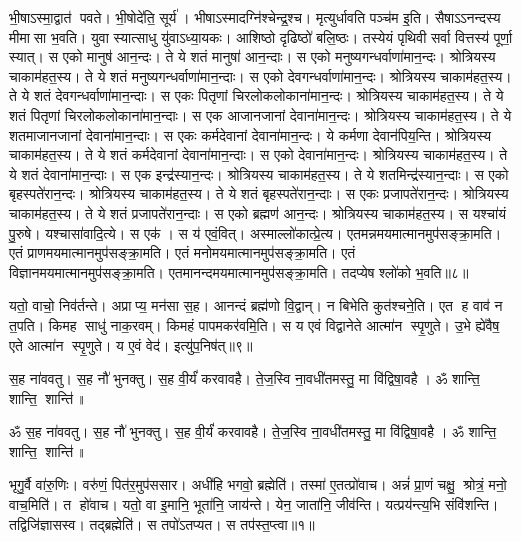 भी॒षाऽस्मा॒द्वात॑ पवते। भी॒षोदे॑ति॒ सूर्य॑। भीषाऽस्मादग्नि॑श्चेन्द्र॒श्च। मृत्युर्धावति पञ्च॑म इ॒ति। सैषाऽऽनन्दस्य मीमासा भ॒वति। युवा स्यात्साधु यु॑वाऽध्या॒यकः। आशिष्ठो दृढिष्ठो॑ बलि॒ष्ठः। तस्येयं पृथिवी सर्वा वित्तस्य॑ पूर्णा॒ स्यात्। स एको मानुष॑ आन॒न्दः। ते ये शतं मानुषा॑ आन॒न्दाः। स एको मनुष्यगन्धर्वाणा॑मान॒न्दः। श्रोत्रियस्य चाकाम॑हत॒स्य। ते ये शतं मनुष्यगन्धर्वाणा॑मान॒न्दाः। स एको देवगन्धर्वाणा॑मान॒न्दः। श्रोत्रियस्य चाकाम॑हत॒स्य। ते ये शतं देवगन्धर्वाणा॑मान॒न्दाः। स एकः पितृणां चिरलोकलोकाना॑मान॒न्दः। श्रोत्रियस्य चाकाम॑हत॒स्य। ते ये शतं पितृणां चिरलोकलोकाना॑\-मान॒न्दाः। स एक आजानजानां देवाना॑मान॒न्दः। श्रोत्रियस्य चाकाम॑हत॒स्य। ते ये शतमाजानजानां देवाना॑मान॒न्दाः। स एकः कर्मदेवानां देवाना॑मान॒न्दः। ये कर्मणा देवान॑पिय॒न्ति। श्रोत्रियस्य चाकाम॑हत॒स्य। ते ये शतं कर्मदेवानां देवाना॑मान॒न्दाः। स एको देवाना॑मान॒न्दः। श्रोत्रियस्य चाकाम॑हत॒स्य। ते ये शतं देवाना॑मान॒न्दाः। स एक इन्द्र॑स्यान॒न्दः। श्रोत्रियस्य चाकाम॑हत॒स्य। ते ये शतमिन्द्र॑स्यान॒न्दाः। स एको बृहस्पते॑रान॒न्दः। श्रोत्रियस्य चाकाम॑हत॒स्य। ते ये शतं बृहस्पते॑रान॒न्दाः। स एकः प्रजापते॑रान॒न्दः। श्रोत्रियस्य चाकाम॑हत॒स्य। ते ये शतं प्रजापते॑रान॒न्दाः। स एको ब्रह्मण॑ आन॒न्दः। श्रोत्रियस्य चाकाम॑हत॒स्य। स यश्चा॑यं पु॒रुषे। यश्चासा॑वादि॒त्ये। स एक॑। स य॑ एवं॒वित्। अस्माल्लो॑कात्प्रे॒त्य। एतमन्नमयमात्मानमुप॑सङ्क्रा॒मति। एतं प्राणमयमात्मानमुप॑सङ्क्रा॒मति। एतं मनोमयमात्मानमुप॑\-सङ्क्रा॒मति। एतं विज्ञानमयमात्मानमुप॑\-सङ्क्रा॒मति। एतमानन्द\-मयमात्मानमुप॑\-सङ्क्रा॒मति। तदप्येष श्लो॑को भ॒वति॥८॥

यतो॒ वाचो॒ निव॑र्तन्ते। अप्राप्य॒ मन॑सा स॒ह। आनन्दं ब्रह्म॑णो वि॒द्वान्। न बिभेति कुत॑श्चने॒ति। एत ह वाव॑ न त॒पति। किमह साधु॑ नाक॒रवम्। किमहं पापमकर॑वमि॒ति। स य एवं  विद्वानेते आत्मा॑न स्पृ॒णुते। उ॒भे ह्ये॑वैष॒ एते आत्मा॑न स्पृ॒णुते। य ए॒वं वेद॑। इत्यु॑प॒निष॑त्॥९॥

स॒ह ना॑ववतु। स॒ह नौ॑ भुनक्तु। स॒ह वी॒र्यं॑ करवावहै। ते॒ज॒स्वि ना॒वधी॑तमस्तु॒ मा वि॑द्विषा॒वहै। ॐ शान्ति॒ शान्ति॒ शान्ति॑॥

\closesection
\clearpage

\setcounter{anuvakam}{0}
ॐ स॒ह ना॑ववतु। स॒ह नौ॑ भुनक्तु। स॒ह वी॒र्यं॑ करवावहै। ते॒ज॒स्वि ना॒वधी॑तमस्तु॒ मा वि॑द्विषा॒वहै। ॐ शान्ति॒ शान्ति॒ शान्ति॑॥


भृगु॒र्वै वा॑रु॒णिः। वरु॑णं॒ पित॑र॒मुप॑ससार। अधी॑हि भगवो॒ ब्रह्मेति॑। तस्मा॑ ए॒तत्प्रो॑वाच। अन्नं॑ प्रा॒णं चक्षु॒ श्रोत्रं॒ मनो॒ वाच॒मिति॑। त हो॑वाच। यतो॒ वा इ॒मानि॒ भूता॑नि॒ जाय॑न्ते। येन॒ जाता॑नि॒ जीव॑न्ति। यत्प्रय॑न्त्य॒भि संवि॑शन्ति। तद्विजि॑ज्ञासस्व। तद्ब्रह्मेति॑। स तपो॑ऽतप्यत। स तप॑स्त॒प्त्वा॥१॥

